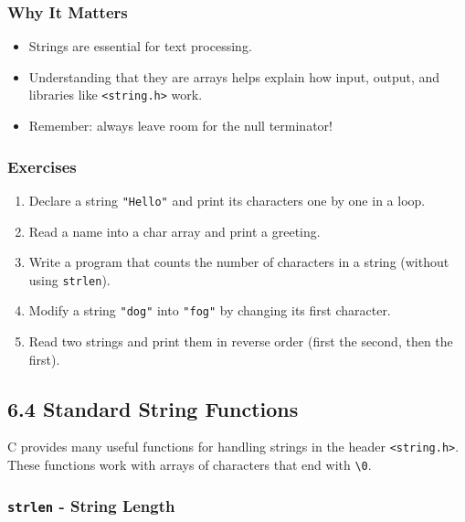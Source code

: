 \documentclass[
  letterpaper,
  DIV=11,
  numbers=noendperiod]{scrreprt}
\providecommand{\tightlist}{%
  \setlength{\itemsep}{0pt}\setlength{\parskip}{0pt}}
\begin{document}
\subsubsection{Why It Matters}\label{why-it-matters-26}

\begin{itemize}
\tightlist
\item
  Strings are essential for text processing.
\item
  Understanding that they are arrays helps explain how input, output,
  and libraries like \texttt{\textless{}string.h\textgreater{}} work.
\item
  Remember: always leave room for the null terminator!
\end{itemize}

\subsubsection{Exercises}\label{exercises-27}

\begin{enumerate}
\def\labelenumi{\arabic{enumi}.}
\tightlist
\item
  Declare a string \texttt{"Hello"} and print its characters one by one
  in a loop.
\item
  Read a name into a char array and print a greeting.
\item
  Write a program that counts the number of characters in a string
  (without using \texttt{strlen}).
\item
  Modify a string \texttt{"dog"} into \texttt{"fog"} by changing its
  first character.
\item
  Read two strings and print them in reverse order (first the second,
  then the first).
\end{enumerate}

\subsection{6.4 Standard String
Functions}\label{standard-string-functions}

C provides many useful functions for handling strings in the header
\texttt{\textless{}string.h\textgreater{}}. These functions work with
arrays of characters that end with
\texttt{\textquotesingle{}\textbackslash{}0\textquotesingle{}}.

\subsubsection{\texorpdfstring{\texttt{strlen} - String
Length}{strlen - String Length}}\label{strlen---string-length}
\end{document}
